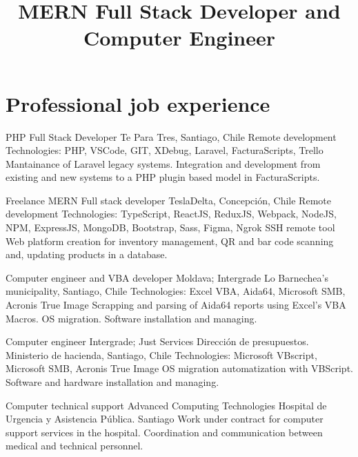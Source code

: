 \documentclass[draft,color,12pt,letterpaper,sans]{moderncv}
\title{MERN Full Stack Developer and Computer Engineer}
\begin{document}
\makecvtitle %

\section{Professional job experience}
{PHP Full Stack Developer}
{Te Para Tres, Santiago, Chile}
{\newline Remote development}
{\newline Technologies: PHP, VSCode, GIT, XDebug, Laravel, FacturaScripts, Trello}
{Mantainance of Laravel legacy systems. Integration and development from existing and new systems to a PHP plugin based model in FacturaScripts.\newline}

{Freelance MERN Full stack developer}
{TeslaDelta, Concepci\'on, Chile}
{\newline Remote development}
{\newline Technologies: TypeScript, ReactJS, ReduxJS, Webpack, NodeJS, NPM, ExpressJS, MongoDB, Bootstrap, Sass, Figma, Ngrok SSH remote tool}
{Web platform creation for inventory management, QR and bar code scanning and, updating products in a database.\newline}

{Computer engineer and VBA developer}
{Moldava; Intergrade}
{Lo Barnechea's municipality, Santiago, Chile}
{\newline Technologies: Excel VBA, Aida64, Microsoft SMB, Acronis True Image}
{Scrapping and parsing of Aida64 reports using Excel's VBA Macros. OS migration. Software installation and managing.\newline}


{Computer engineer}
{Intergrade; Just Services}
{Direcci\'on de presupuestos. Ministerio de hacienda, Santiago, Chile}
{\newline Technologies: Microsoft VBscript, Microsoft SMB, Acronis True Image}
{OS migration automatization with VBScript. Software and hardware installation and managing.\newline}

{Computer technical support}
{Advanced Computing Technologies}
{Hospital de Urgencia y Asistencia P\'ublica. Santiago}
{}
{Work under contract for computer support services in the hospital. Coordination and communication between medical and technical personnel.\newline}
\end{document}
